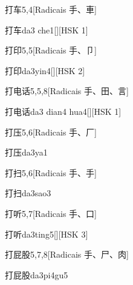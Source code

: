 \begin{entry}{打车}{5,4}[Radicais ⼿、⾞]
  \begin{phonetics}{打车}{da3 che1}[][HSK 1]
  \end{phonetics}
\end{entry}

\begin{entry}{打印}{5,5}[Radicais ⼿、⼙]
  \begin{phonetics}{打印}{da3yin4}[][HSK 2]
  \end{phonetics}
\end{entry}

\begin{entry}{打电话}{5,5,8}[Radicais ⼿、⽥、⾔]
  \begin{phonetics}{打电话}{da3 dian4 hua4}[][HSK 1]
  \end{phonetics}
\end{entry}

\begin{entry}{打压}{5,6}[Radicais ⼿、⼚]
  \begin{phonetics}{打压}{da3ya1}
  \end{phonetics}
\end{entry}

\begin{entry}{打扫}{5,6}[Radicais ⼿、⼿]
  \begin{phonetics}{打扫}{da3sao3}
  \end{phonetics}
\end{entry}

\begin{entry}{打听}{5,7}[Radicais ⼿、⼝]
  \begin{phonetics}{打听}{da3ting5}[][HSK 3]
  \end{phonetics}
\end{entry}

\begin{entry}{打屁股}{5,7,8}[Radicais ⼿、⼫、⾁]
  \begin{phonetics}{打屁股}{da3pi4gu5}
  \end{phonetics}
\end{entry}

